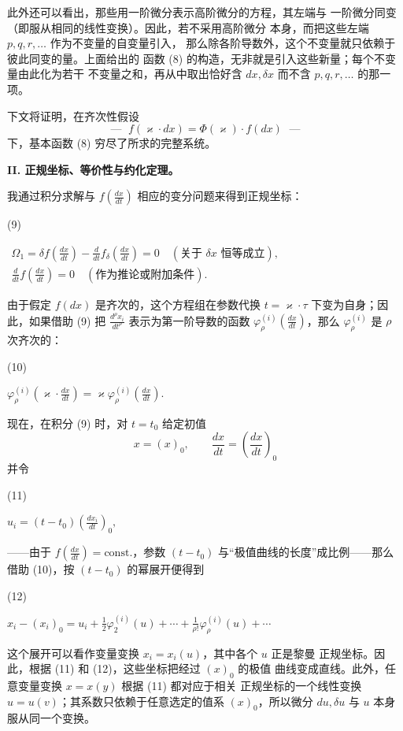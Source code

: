 \documentclass[11pt]{article}
\providecommand{\srcnumdisplay}[3][3.4em]{%
  \par\smallskip\noindent
  \begin{minipage}[t]{#1}\vspace*{0pt}#2\end{minipage}%
  \begin{minipage}[t]{\dimexpr\linewidth-#1\relax}\vspace*{0pt}\centering
  \(\displaystyle #3\)
  \end{minipage}\par\smallskip}
\begin{document}
此外还可以看出，那些用一阶微分表示高阶微分的方程，其左端与
一阶微分同变（即服从相同的线性变换）。因此，若不采用高阶微分
本身，而把这些左端 \(p,q,r,\ldots\) 作为不变量的自变量引入，
那么除各阶导数外，这个不变量就只依赖于彼此同变的量。上面给出的
函数 (8) 的构造，无非就是引入这些新量；每个不变量由此化为若干
不变量之和，再从中取出恰好含 \(dx,\delta x\) 而不含
\(p,q,r,\ldots\) 的那一项。

下文将证明，在齐次性假设
\[
\text{--- }\;f(\varkappa\cdot dx)=\Phi(\varkappa)\cdot f(dx)\;\text{ ---}
\]
下，基本函数 (8) 穷尽了所求的完整系统。

\begin{center}
\textbf{II. 正规坐标、等价性与约化定理。}
\end{center}

我通过积分求解与
\(f\!\left(\frac{dx}{dt}\right)\) 相应的变分问题来得到正规坐标：
\srcnumdisplay{(9)}{%
\begin{gathered}
\Omega_1=\delta f\!\left(\frac{dx}{dt}\right)
-\frac{d}{dt}f_\delta\!\left(\frac{dx}{dt}\right)=0
\quad(\text{关于 }\delta x\text{ 恒等成立}),\\
\frac{d}{dt}f\!\left(\frac{dx}{dt}\right)=0
\quad(\text{作为推论或附加条件}).
\end{gathered}
}
由于假定 \(f(dx)\) 是齐次的，这个方程组在参数代换
\(t=\varkappa\cdot\tau\) 下变为自身；因此，如果借助 (9) 把
\(\frac{d^\rho x_i}{dt^\rho}\) 表示为第一阶导数的函数
\(\varphi_\rho^{(i)}\!\left(\frac{dx}{dt}\right)\)，那么
\(\varphi_\rho^{(i)}\) 是 \(\rho\) 次齐次的：
\srcnumdisplay{(10)}{%
\varphi_\rho^{(i)}\!\left(\varkappa\cdot\frac{dx}{dt}\right)
=\varkappa\varphi_\rho^{(i)}\!\left(\frac{dx}{dt}\right).
}
现在，在积分 (9) 时，对 \(t=t_0\) 给定初值
\[
x=(x)_0,\qquad \frac{dx}{dt}=\left(\frac{dx}{dt}\right)_0
\]
并令
\srcnumdisplay{(11)}{%
u_i=(t-t_0)\left(\frac{dx_i}{dt}\right)_0,
}
——由于 \(f\!\left(\frac{dx}{dt}\right)=\mathrm{const.}\)，参数
\((t-t_0)\) 与“极值曲线的长度”成比例——那么借助 (10)，按
\((t-t_0)\) 的幂展开便得到
\srcnumdisplay{(12)}{%
x_i-(x_i)_0=u_i+\frac12\varphi_2^{(i)}(u)+\cdots+
\frac{1}{\rho!}\varphi_\rho^{(i)}(u)+\cdots
}
这个展开可以看作变量变换 \(x_i=x_i(u)\)，其中各个 \(u\) 正是黎曼
正规坐标。因此，根据 (11) 和 (12)，这些坐标把经过 \((x)_0\) 的极值
曲线变成直线。此外，任意变量变换 \(x=x(y)\) 根据 (11) 都对应于相关
正规坐标的一个线性变换 \(u=u(v)\)；其系数只依赖于任意选定的值系
\((x)_0\)，所以微分 \(du,\delta u\) 与 \(u\) 本身服从同一个变换。
\end{document}
